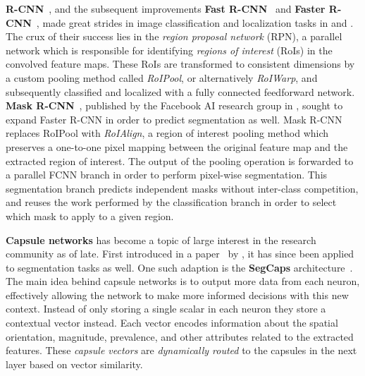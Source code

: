 \textbf{R-CNN}~\cite{r-cnn}, and the subsequent improvements \textbf{Fast R-CNN}~\cite{fast-r-cnn} and \textbf{Faster R-CNN}~\cite{faster-r-cnn}, made great strides in image classification and localization tasks in \citeyear{r-cnn} and \citeyear{faster-r-cnn}.
The crux of their success lies in the \textit{region proposal network} (RPN), a parallel network which is responsible for identifying \textit{regions of interest} (RoIs) in the convolved feature maps.
These RoIs are transformed to consistent dimensions by a custom pooling method called \textit{RoIPool}, or alternatively \textit{RoIWarp}, and subsequently classified and localized with a fully connected feedforward network.
\textbf{Mask R-CNN}~\cite{mask-r-cnn}, published by the Facebook AI research group in \citeyear{mask-r-cnn}, sought to expand Faster R-CNN in order to predict segmentation as well.
Mask R-CNN replaces RoIPool with \textit{RoIAlign}, a region of interest pooling method which preserves a one-to-one pixel mapping between the original feature map and the extracted region of interest.
The output of the pooling operation is forwarded to a parallel FCNN branch in order to perform pixel-wise segmentation.
This segmentation branch predicts independent masks without inter-class competition, and reuses the work performed by the classification branch in order to select which mask to apply to a given region.

\textbf{Capsule networks} has become a topic of large interest in the research community as of late.
First introduced in a paper~\cite{capsules} by \citeauthor{capsules}, it has since been applied to segmentation tasks as well.
One such adaption is the \textbf{SegCaps} architecture~\cite{segmentation-segcaps}.
The main idea behind capsule networks is to output more data from each neuron, effectively allowing the network to make more informed decisions with this new context.
Instead of only storing a single scalar in each neuron they store a contextual vector instead.
Each vector encodes information about the spatial orientation, magnitude, prevalence, and other attributes related to the extracted features.
These \textit{capsule vectors} are \textit{dynamically routed} to the capsules in the next layer based on vector similarity.
